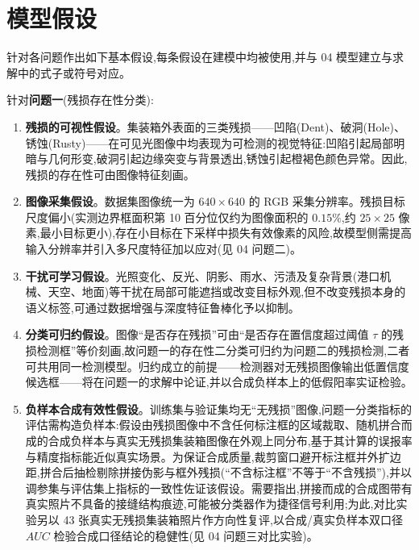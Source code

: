 \section{模型假设}

针对各问题作出如下基本假设,每条假设在建模中均被使用,并与 04 模型建立与求解中的式子或符号对应。

针对\textbf{问题一}(残损存在性分类):

\begin{enumerate}
\item \textbf{残损的可视性假设}。集装箱外表面的三类残损——凹陷(Dent)、破洞(Hole)、锈蚀(Rusty)——在可见光图像中均表现为可检测的视觉特征:凹陷引起局部明暗与几何形变,破洞引起边缘突变与背景透出,锈蚀引起橙褐色颜色异常。因此,残损的存在性可由图像特征刻画。

\item \textbf{图像采集假设}。数据集图像统一为 $640\times640$ 的 RGB 采集分辨率。残损目标尺度偏小(实测边界框面积第 10 百分位仅约为图像面积的 $0.15\%$,约 $25\times25$ 像素,最小目标更小),存在小目标在下采样中损失有效像素的风险,故模型侧需提高输入分辨率并引入多尺度特征加以应对(见 04 问题二)。

\item \textbf{干扰可学习假设}。光照变化、反光、阴影、雨水、污渍及复杂背景(港口机械、天空、地面)等干扰在局部可能遮挡或改变目标外观,但不改变残损本身的语义标签,可通过数据增强与深度特征鲁棒化予以抑制。

\item \textbf{分类可归约假设}。图像“是否存在残损”可由“是否存在置信度超过阈值 $\tau$ 的残损检测框”等价刻画,故问题一的存在性二分类可归约为问题二的残损检测,二者可共用同一检测模型。归约成立的前提——检测器对无残损图像输出低置信度候选框——将在问题一的求解中论证,并以合成负样本上的低假阳率实证检验。

\item \textbf{负样本合成有效性假设}。训练集与验证集均无“无残损”图像,问题一分类指标的评估需构造负样本:假设由残损图像中不含任何标注框的区域裁取、随机拼合而成的合成负样本与真实无残损集装箱图像在外观上同分布,基于其计算的误报率与精度指标能近似真实场景。为保证合成质量,裁剪窗口避开标注框并外扩边距,拼合后抽检剔除拼接伪影与框外残损(“不含标注框”不等于“不含残损”),并以调参集与评估集上指标的一致性佐证该假设。需要指出,拼接而成的合成图带有真实照片不具备的接缝结构痕迹,可能被分类器作为捷径信号利用;为此,对比实验另以 43 张真实无残损集装箱照片作方向性复评,以合成/真实负样本双口径 $AUC$ 检验合成口径结论的稳健性(见 04 问题三对比实验)。

\end{enumerate}

